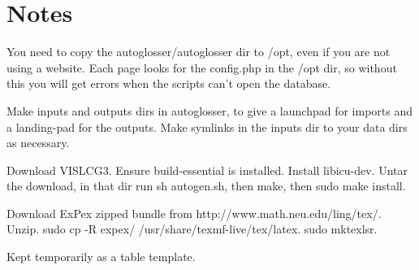 \documentclass[a4paper,10pt]{article}
\begin{document}
{\section{Notes}

You need to copy the autoglosser/autoglosser dir to /opt, even if you are not using a website.  Each page looks for the config.php in the /opt dir, so without this you will get errors when the scripts can't open the database.

Make inputs and outputs dirs in autoglosser, to give a launchpad for imports and a landing-pad for the outputs.  Make symlinks in the inputs dir to your data dirs as necessary.

Download VISLCG3.  Ensure build-essential is installed. Install libicu-dev.  Untar the download, in that dir run sh autogen.sh, then make, then sudo make install.

Download ExPex zipped bundle from http://www.math.neu.edu/ling/tex/.  Unzip.  sudo cp -R expex/ /usr/share/texmf-live/tex/latex.  sudo mktexlsr.



\newpage


Kept temporarily as a table template.

}
\end{document}
